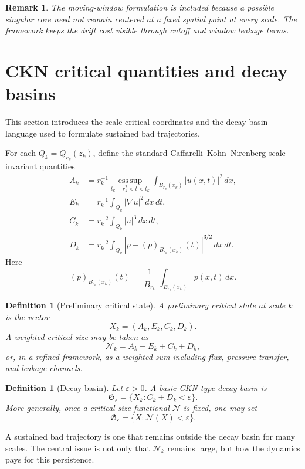 \documentclass[11pt]{article}
\numberwithin{equation}{section}
\newtheorem{definition}[theorem]{Definition}
\newtheorem{remark}[theorem]{Remark}
\newcommand{\eps}{\varepsilon}
\newcommand{\Gdec}{\mathfrak G}
\newcommand{\dd}{\,d}
\newcommand{\N}{\mathcal N}
\begin{document}
\begin{remark}
The moving-window formulation is included because a possible singular core need not remain centered at a fixed spatial point at every scale.  The framework keeps the drift cost visible through cutoff and window leakage terms.
\end{remark}

\section{CKN critical quantities and decay basins}\label{sec:critical-quantities}
\noindent This section introduces the scale-critical coordinates and the decay-basin language used to formulate sustained bad trajectories.

For each $Q_k=Q_{r_k}(z_k)$, define the standard Caffarelli--Kohn--Nirenberg scale-invariant quantities \cite{CKN1982,Lin1998,SereginLectureNotes}
\begin{align}
A_k
&=r_k^{-1}\operatorname*{ess\,sup}_{t_k-r_k^2<t<t_k}
\int_{B_{r_k}(x_k)} |u(x,t)|^2\dd x,\label{eq:A}\\
E_k
&=r_k^{-1}\int_{Q_k}|\nabla u|^2\dd x\dd t,\label{eq:E}\\
C_k
&=r_k^{-2}\int_{Q_k}|u|^3\dd x\dd t,\label{eq:C}\\
D_k
&=r_k^{-2}\int_{Q_k}|p-(p)_{B_{r_k}(x_k)}(t)|^{3/2}\dd x\dd t.\label{eq:D}
\end{align}
Here
\[
(p)_{B_{r_k}(x_k)}(t)=\frac{1}{|B_{r_k}|}
\int_{B_{r_k}(x_k)}p(x,t)\dd x.
\]

\begin{definition}[Preliminary critical state]\label{def:prelim-state}
A preliminary critical state at scale $k$ is the vector
\[
X_k=(A_k,E_k,C_k,D_k).
\]
A weighted critical size may be taken as
\[
\N_k=A_k+E_k+C_k+D_k,
\]
or, in a refined framework, as a weighted sum including flux, pressure-transfer, and leakage channels.
\end{definition}

\begin{definition}[Decay basin]\label{def:decay-basin}
Let $\eps>0$.  A basic CKN-type decay basin is
\[
\Gdec_\eps=\{X_k:C_k+D_k<\eps\}.
\]
More generally, once a critical size functional $\N$ is fixed, one may set
\[
\Gdec_\eps=\{X:\N(X)<\eps\}.
\]
\end{definition}

A sustained bad trajectory is one that remains outside the decay basin for many scales.  The central issue is not only that $\N_k$ remains large, but how the dynamics pays for this persistence.
\end{document}
